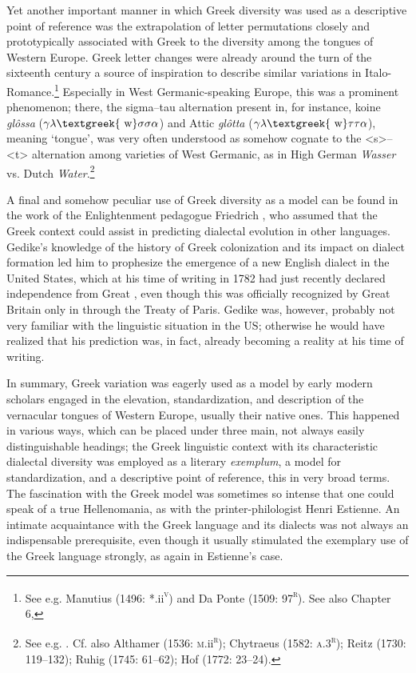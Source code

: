 \documentclass[output=paper]{langsci/langscibook}
\begin{document}
Yet another important manner in which Greek diversity was used as a descriptive point of reference was the extrapolation of letter permutations closely and prototypically associated with Greek to the diversity among the tongues of Western Europe. Greek letter changes were already around the turn of the sixteenth century a source of inspiration to describe similar variations in Italo-Romance.\footnote{See e.g. Manutius (1496: *.ii\textsc{\textsuperscript{v}}) and Da Ponte (1509: 97\textsc{\textsuperscript{r}}). See also Chapter 6, } Especially in West Germanic-speaking Europe, this was a prominent phenomenon; there, the sigma–tau alternation present in, for instance, koine \textit{glôssa} ($\gamma \lambda \text{\textgreek{~w}}\sigma \sigma \alpha $) and Attic \textit{glôtta} ($\gamma \lambda \text{\textgreek{~w}}\tau \tau \alpha $), meaning ‘tongue’, was very often understood as somehow cognate to the <s>–<t> alternation among varieties of West Germanic, as in High German \textit{Wasser} vs. Dutch \textit{Water}.\footnote{See e.g. \citet[21]{Mylius1612}. Cf. also Althamer (1536: \textsc{m}.ii\textsc{\textsuperscript{r}}); Chytraeus (1582: \textsc{a.3}\textsc{\textsuperscript{r}}); Reitz (1730: 119–132); Ruhig (1745: 61–62); Hof (1772: 23–24).}

A final and somehow peculiar use of Greek diversity as a model can be found in the work of the Enlightenment pedagogue Friedrich \citet[7]{Gedike1782}, who assumed that the Greek context could assist in predicting dialectal evolution in other languages. Gedike’s knowledge of the history of Greek colonization and its impact on dialect formation led him to prophesize the emergence of a new English dialect in the United States, which at his time of writing in 1782 had just recently declared independence from Great \citet{Britain1776}, even though this was officially recognized by Great Britain only in \citealt{September1783} through the Treaty of Paris. Gedike was, however, probably not very familiar with the linguistic situation in the US; otherwise he would have realized that his prediction was, in fact, already becoming a reality at his time of writing.

In summary, Greek variation was eagerly used as a model by early modern scholars engaged in the elevation, standardization, and description of the vernacular tongues of Western Europe, usually their native ones. This happened in various ways, which can be placed under three main, not always easily distinguishable headings; the Greek linguistic context with its characteristic dialectal diversity was employed as  a literary \textit{exemplum},  a model for standardization, and  a descriptive point of reference, this in very broad terms. The fascination with the Greek model was sometimes so intense that one could speak of a true Hellenomania, as with the printer-philologist Henri Estienne. An intimate acquaintance with the Greek language and its dialects was not always an indispensable prerequisite, even though it usually stimulated the exemplary use of the Greek language strongly, as again in Estienne’s case.
\end{document}
